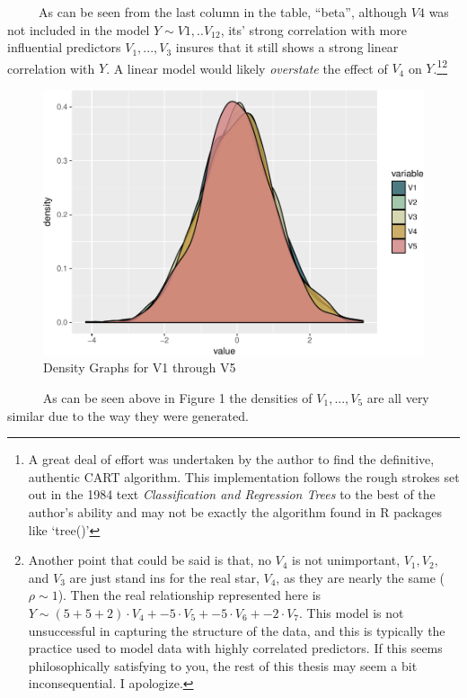 \documentclass[12pt,twoside]{reedthesis}
\begin{document}
  ~~~~~As can be seen from the last column in the table, ``beta'',
  although \(V4\) was not included in the model \(Y \sim V1,..V_{12}\),
  its' strong correlation with more influential predictors \(V_1,...,V_3\)
  insures that it still shows a strong linear correlation with \(Y\). A
  linear model would likely \emph{overstate} the effect of \(V_4\) on
  \(Y\).\footnote{A great deal of effort was undertaken by the author to
    find the definitive, authentic CART algorithm. This implementation
    follows the rough strokes set out in the 1984 text
    \emph{Classification and Regression Trees} to the best of the author's
    ability and may not be exactly the algorithm found in R packages like
    `tree()'}\footnote{Another point that could be said is that, no
    \(V_4\) is not unimportant, \(V_1, V_2,\) and \(V_3\) are just stand
    ins for the real star, \(V_4\), as they are nearly the same
    (\(\rho \sim 1\)). Then the real relationship represented here is
    \(Y \sim (5 + 5 + 2) \cdot V_4 + -5 \cdot V_5 + -5 \cdot V_6 + -2 \cdot V_7\).
    This model is not unsuccessful in capturing the structure of the data,
    and this is typically the practice used to model data with highly
    correlated predictors. If this seems philosophically satisfying to
    you, the rest of this thesis may seem a bit inconsequential. I
    apologize.}
  
  \begin{figure}[htbp]
  \centering
  \includegraphics{Thesis_files/figure-latex/denv1v5-1.pdf}
  \caption{\label{fig:denv1v5}Density Graphs for V1 through V5}
  \end{figure}
  
  ~~~~~ As can be seen above in Figure 1 the densities of \(V_1,...,V_5\)
  are all very similar due to the way they were generated.
  
\end{document}

